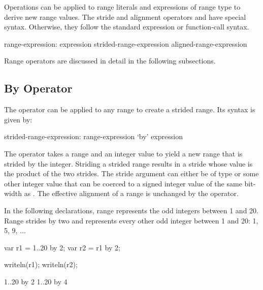 Operations can be applied to range literals and expressions of range type to
derive new range values.  The stride and alignment operators 
and  have special syntax.  Otherwise, they follow the standard
expression or function-call syntax.
\begin{syntax}
range-expression:
  expression
  strided-range-expression
  aligned-range-expression
\end{syntax}

Range operators are discussed in detail in the following subsections.

\subsection{By Operator}
\label{By_Operator_For_Ranges}

The  operator can be applied to any range to create a strided
range.  Its syntax is given by:
\begin{syntax}
strided-range-expression:
  range-expression `by' expression
\end{syntax}

The  operator takes a range and an integer value to yield a
new range that is strided by the integer.  Striding a strided range
results in a stride whose value is the product of the two strides.
The stride argument can either be of type  or some other
integer value that can be coerced to a signed integer value of the same
bit-width as .  The effective alignment of a range is unchanged by
the  operator.

\begin{example}
In the following declarations, range  represents the odd integers
between 1 and 20. Range  strides  by two and represents
every other odd integer between 1 and 20: 1, 5, 9, ...
\begin{chapelpre}
\end{chapelpre}
\begin{chapel}
var r1 = 1..20 by 2;
var r2 = r1 by 2;
\end{chapel}
\begin{chapelpost}
writeln(r1);
writeln(r2);
\end{chapelpost}
\begin{chapeloutput}
1..20 by 2
1..20 by 4
\end{chapeloutput}
\end{example}

